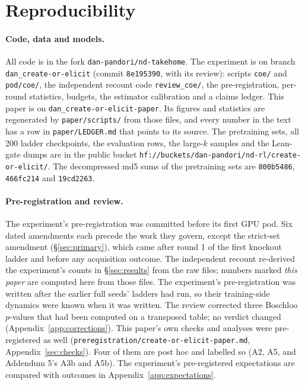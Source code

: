 \section{Reproducibility}
\label{sec:repro}

\paragraph{Code, data and models.} All code is in the fork \texttt{dan-pandori/nd-takehome}. The experiment is on branch
\texttt{dan\_create-or-elicit} (commit \texttt{8e195390}, with its review): scripts \texttt{coe/} and \texttt{pod/coe/},
the independent recount code \texttt{review\_coe/}, the pre-registration, per-round statistics, budgets, the estimator
calibration and a claims ledger. This paper is on \texttt{dan\_create-or-elicit-paper}. Its figures and statistics are
regenerated by \texttt{paper/scripts/} from those files, and every number in the text has a row in
\texttt{paper/LEDGER.md} that points to its source. The pretraining sets, all 200 ladder checkpoints, the evaluation rows,
the large-$k$ samples and the Lean-gate dumps are in the public bucket
\texttt{hf://buckets/dan-pandori/nd-rl/create-or-elicit/}. The decompressed md5 sums of the pretraining sets are \KT{}
\texttt{800b5486}, \KTko{} \texttt{466fc214} and \KTdose{} \texttt{19cd2263}.

\paragraph{Pre-registration and review.} The experiment's pre-registration was committed before its first GPU pod. Six
dated amendments each precede the work they govern, except the strict-set amendment (\S\ref{sec:primary}), which came
after round 1 of the first knockout ladder and before any acquisition outcome. The independent recount re-derived the experiment's
counts in \S\ref{sec:results} from the raw files; numbers marked \emph{this paper} are computed here from those files.
The experiment's pre-registration was written after the earlier full seeds' ladders had run, so their training-side
dynamics were known when it was written. The review corrected three Boschloo $p$-values that had been computed on a
transposed table; no verdict changed (Appendix~\ref{app:corrections}). This paper's own checks and analyses were
pre-registered as well (\texttt{preregistration/create-or-elicit-paper.md}, Appendix~\ref{sec:checks}). Four of them are
post hoc and labelled so (A2, A5, and Addendum 5's A3b and A5b). The experiment's pre-registered expectations are compared with outcomes in
Appendix~\ref{app:expectations}.

